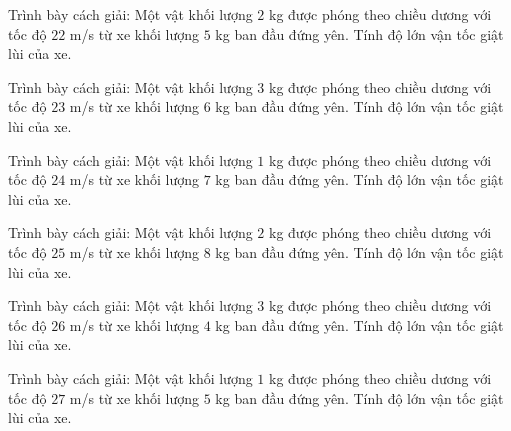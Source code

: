 \begin{bt}
Trình bày cách giải: Một vật khối lượng $2$ kg được phóng theo chiều dương với tốc độ $22$ m/s từ xe khối lượng $5$ kg ban đầu đứng yên. Tính độ lớn vận tốc giật lùi của xe.
\end{bt}

\begin{bt}
Trình bày cách giải: Một vật khối lượng $3$ kg được phóng theo chiều dương với tốc độ $23$ m/s từ xe khối lượng $6$ kg ban đầu đứng yên. Tính độ lớn vận tốc giật lùi của xe.
\end{bt}

\begin{bt}
Trình bày cách giải: Một vật khối lượng $1$ kg được phóng theo chiều dương với tốc độ $24$ m/s từ xe khối lượng $7$ kg ban đầu đứng yên. Tính độ lớn vận tốc giật lùi của xe.
\end{bt}

\begin{bt}
Trình bày cách giải: Một vật khối lượng $2$ kg được phóng theo chiều dương với tốc độ $25$ m/s từ xe khối lượng $8$ kg ban đầu đứng yên. Tính độ lớn vận tốc giật lùi của xe.
\end{bt}

\begin{bt}
Trình bày cách giải: Một vật khối lượng $3$ kg được phóng theo chiều dương với tốc độ $26$ m/s từ xe khối lượng $4$ kg ban đầu đứng yên. Tính độ lớn vận tốc giật lùi của xe.
\end{bt}

\begin{bt}
Trình bày cách giải: Một vật khối lượng $1$ kg được phóng theo chiều dương với tốc độ $27$ m/s từ xe khối lượng $5$ kg ban đầu đứng yên. Tính độ lớn vận tốc giật lùi của xe.
\end{bt}

